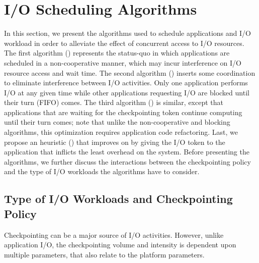 \section{I/O Scheduling Algorithms}\label{sec:algorithms}
\begin{comment}
  \begin{itemize}
    \end{itemize}
  \end{itemize}
\end{comment}

In this section, we present the algorithms used to schedule applications
and I/O workload in order to alleviate the effect of concurrent access
to I/O resources. The first algorithm (\nocoop) represents the status-quo
in which applications are scheduled in a non-cooperative manner, which may
incur interference on I/O resource access and wait time. The second
algorithm (\fifoblock) inserts some coordination to eliminate interference
between I/O activities. Only one application performs I/O at any given
time while other applications requesting I/O are blocked until their
turn (FIFO) comes. The third algorithm (\fifononblock) is similar, except
that applications that are waiting for the checkpointing token
continue computing until their turn comes; note that unlike the
non-cooperative and blocking algorithms, this optimization requires
application code refactoring. Last, we propose an heuristic
(\leastwaste) that improves on \fifononblock by giving the I/O token
to the application that inflicts the least overhead on the system. Before
presenting the algorithms, we further discuss the interactions between
the checkpointing policy and the type of I/O workloads the algorithms
have to consider.


\subsection{Type of I/O Workloads and Checkpointing Policy}

Checkpointing can be a major source of I/O activities. However,
unlike application I/O, the checkpointing volume and intensity is
dependent upon multiple parameters, that also relate to the platform
parameters.

